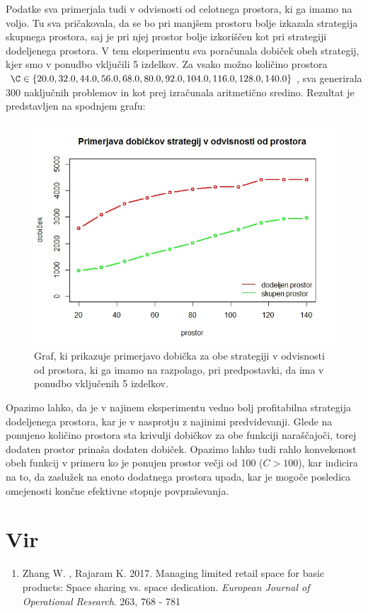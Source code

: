 \documentclass[a4paper]{article}
\begin{document}
Podatke sva primerjala tudi v odvisnosti od celotnega prostora, ki ga imamo na voljo. Tu sva pričakovala, da se bo pri manjšem prostoru bolje izkazala strategija skupnega prostora, saj je pri njej prostor bolje izkoriščen kot pri strategiji dodeljenega prostora. V tem eksperimentu sva poračunala dobiček obeh strategij, kjer smo v ponudbo vključili 5 izdelkov. Za vsako možno količino prostora $\C \in \{20.0, 32.0, 44.0, 56.0, 68.0, 80.0, 92.0, 104.0, 116.0, 128.0, 140.0\}$, sva generirala 300 naključnih problemov in kot prej izračunala aritmetično sredino. Rezultat je predstavljen na spodnjem grafu:

\begin{figure}[ht]
\includegraphics [scale = 0.6]{primerjava-strategij-kolicina-prostora}
\caption{Graf, ki prikazuje primerjavo dobička za obe strategiji v odvisnosti od prostora, ki ga imamo na razpolago, pri predpostavki, da ima v ponudbo vključenih 5 izdelkov.}
\end{figure}

Opazimo lahko, da je v najinem eksperimentu vedno bolj profitabilna strategija dodeljenega prostora, kar je v nasprotju z najinimi predvidevanji. Glede na ponujeno količino prostora sta krivulji dobičkov za obe funkciji naraščajoči, torej dodaten prostor prinaša dodaten dobiček. Opazimo lahko tudi rahlo konveksnost obeh funkcij v primeru ko je ponujen prostor večji od 100 ($C > 100$), kar indicira na to, da zaslužek na enoto dodatnega prostora upada, kar je mogoče posledica omejenosti končne efektivne stopnje povpraševanja.

\section{Vir}

\begin{enumerate}
\item Zhang W. , Rajaram K. 2017. Managing limited retail space for basic products: Space sharing vs. space dedication. \textit{European Journal of Operational Research}. 263, 768 - 781
\end{enumerate}
\end{document}
